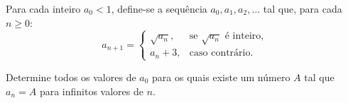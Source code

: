 Para cada inteiro $a_0 < 1$, define-se a sequência $a_0, a_1, a_2, \ldots$ tal que, para cada $n \geq 0$:
\[a_{n+1} = 
\begin{cases}
\sqrt{a_n}, & \text{se } \sqrt{a_n} \text{ é inteiro,} \\
a_n + 3,    & \text{caso contrário.}
\end{cases}
\]

Determine todos os valores de $a_0$ para os quais existe um número $A$ tal que $a_n = A$ para infinitos valores de $n$.
